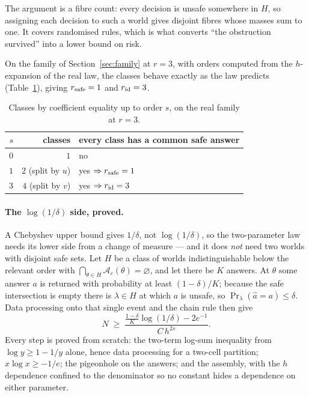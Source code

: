 The argument is a fibre count: every decision is unsafe somewhere in $H$, so assigning each
decision to such a world gives disjoint fibres whose masses sum to one. It covers randomised
rules, which is what converts ``the obstruction survived'' into a lower bound on risk.

On the family of Section~\ref{sec:family} at $r=3$, with orders computed from the
$h$-expansion of the real law, the classes behave exactly as the law predicts
(Table~\ref{tab:classes}), giving $r_{\rm safe}=1$ and $r_{\rm id}=3$. \CERT{}

\begin{table}[t]
\caption{Classes by coefficient equality up to order $s$, on the real family at $r=3$.}
\label{tab:classes}
\centering
\footnotesize
\begin{tabular}{@{}rrl@{}}
\toprule
$s$ & classes & every class has a common safe answer \\
\midrule
$0$ & $1$ & no \\
$1$ & $2$ (split by $u$) & yes $\Rightarrow r_{\rm safe}=1$ \\
$3$ & $4$ (split by $v$) & yes $\Rightarrow r_{\rm id}=3$ \\
\bottomrule
\end{tabular}
\end{table}


\paragraph{The $\log(1/\delta)$ side, proved.}
A Chebyshev upper bound gives $1/\delta$, not $\log(1/\delta)$, so the two-parameter law
needs its lower side from a change of measure --- and it does \emph{not} need two worlds
with disjoint safe sets. Let $H$ be a class of worlds indistinguishable below the relevant
order with $\bigcap_{\theta\in H}\mathcal{A}_{\varepsilon}(\theta)=\varnothing$, and let
there be $K$ answers. At $\theta$ some answer $a$ is returned with probability at least
$(1-\delta)/K$; because the safe intersection is empty there is $\lambda\in H$ at which $a$
is unsafe, so $\Pr_{\lambda}(\hat a=a)\le\delta$. Data processing onto that single event
and the chain rule then give
\[
N\;\ge\;\frac{\frac{1-\delta}{K}\log(1/\delta)-2e^{-1}}{C\,h^{2s}} .
\]
Every step is proved from scratch: the two-term log-sum inequality from $\log y\ge1-1/y$
alone, hence data processing for a two-cell partition; $x\log x\ge-1/e$; the pigeonhole on
the answers; and the assembly, with the $h$ dependence confined to the denominator so no
constant hides a dependence on either parameter.

